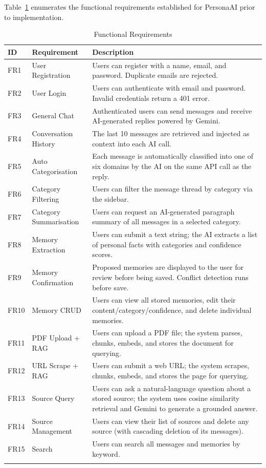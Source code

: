 \documentclass[12pt,a4paper]{report}
\begin{document}
Table~\ref{tab:func_req} enumerates the functional requirements established for PersonaAI prior to implementation.

\begin{longtable}{@{}p{0.5cm} p{4cm} p{9cm}@{}}
\toprule
\textbf{ID} & \textbf{Requirement} & \textbf{Description} \\
\midrule
\endhead
FR1 & User Registration & Users can register with a name, email, and password. Duplicate emails are rejected. \\
FR2 & User Login & Users can authenticate with email and password. Invalid credentials return a 401 error. \\
FR3 & General Chat & Authenticated users can send messages and receive AI-generated replies powered by Gemini. \\
FR4 & Conversation History & The last 10 messages are retrieved and injected as context into each AI call. \\
FR5 & Auto Categorisation & Each message is automatically classified into one of six domains by the AI on the same API call as the reply. \\
FR6 & Category Filtering & Users can filter the message thread by category via the sidebar. \\
FR7 & Category Summarisation & Users can request an AI-generated paragraph summary of all messages in a selected category. \\
FR8 & Memory Extraction & Users can submit a text string; the AI extracts a list of personal facts with categories and confidence scores. \\
FR9 & Memory Confirmation & Proposed memories are displayed to the user for review before being saved. Conflict detection runs before save. \\
FR10 & Memory CRUD & Users can view all stored memories, edit their content/category/confidence, and delete individual memories. \\
FR11 & PDF Upload + RAG & Users can upload a PDF file; the system parses, chunks, embeds, and stores the document for querying. \\
FR12 & URL Scrape + RAG & Users can submit a web URL; the system scrapes, chunks, embeds, and stores the page for querying. \\
FR13 & Source Query & Users can ask a natural-language question about a stored source; the system uses cosine similarity retrieval and Gemini to generate a grounded answer. \\
FR14 & Source Management & Users can view their list of sources and delete any source (with cascading deletion of its messages). \\
FR15 & Search & Users can search all messages and memories by keyword. \\
\bottomrule
\caption{Functional Requirements}
\label{tab:func_req}
\end{longtable}
\end{document}
